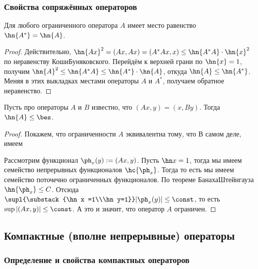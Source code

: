 \documentclass[a4paper]{article}
\begin{document}
\subsubsection{Свойства сопряжённых операторов}

\begin{lemma}Для любого ограниченного оператора $A$ имеет место равенство $\hn{A^*} = \hn{A}$.
\end{lemma}
\begin{proof}
Действительно, $\hn{Ax}^2 = (Ax,Ax) = (A^*Ax,x) \le \hn{A^*A}\cdot\hn{x}^2$ по неравенству Коши\ч Буняковского.
Перейдём к верхней грани по $\hn{x} = 1$, получим $\hn{A}^2 \le \hn{A^*A} \le \hn{A^*} \cdot \hn{A}$,
откуда $\hn{A} \le \hn{A^*}$. Меняя в этих выкладках местами операторы $A$ и $A^*$, получаем обратное неравенство.
\end{proof}

\begin{theorem}
Пусть про операторы $A$ и $B$ известно, что $(Ax,y)=(x,By)$. Тогда $\hn{A}\le\bes$.
\end{theorem}
\begin{proof}
Покажем, что ограниченности $A$ эквивалентна тому, что
В самом деле, имеем

Рассмотрим функционал $\ph_x(y) := (Ax,y)$. Пусть $\hn x = 1$, тогда мы имеем семейство
непрерывных функционалов $\hc{\ph_x}$. Тогда
то есть мы имеем семейство поточечно ограниченных функционалов. По теореме Банаха\ч Штейнгауза $\hn{\ph_x}\le C$.
Отсюда $\supl{\substack{\hn x =1\\\hn y=1}} |\ph_x(y)|\le \const$, то есть $\sup |(Ax,y)|\le \const$.
А это и значит, что оператор $A$ ограничен.
\end{proof}


\subsection{Компактные (вполне непрерывные) операторы}

\subsubsection{Определение и свойства компактных операторов}
\end{document}
